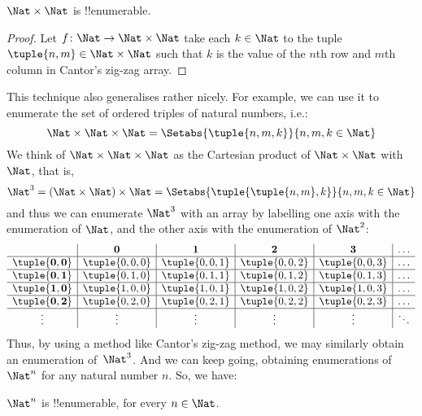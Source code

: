 \documentclass[../../../include/open-logic-section]{subfiles}
\begin{document}
\begin{prop}
$\Nat \times \Nat$ is !!{enumerable}.
\end{prop}

\begin{proof}
Let $f \colon \Nat \to \Nat\times\Nat$ take each $k \in \Nat$ to the
tuple $\tuple{n,m} \in \Nat \times \Nat$ such that $k$ is the value of
the $n$th row and $m$th column in Cantor's zig-zag array. 
\end{proof}

\begin{explain}
This technique also generalises rather nicely. For example, we can use
it to enumerate the set of ordered triples of natural numbers, i.e.:
\[
\Nat \times \Nat \times \Nat = \Setabs{\tuple{n,m,k}}{n,m,k \in \Nat}
\]
We think of $\Nat \times \Nat \times \Nat$ as the Cartesian
product of $\Nat \times \Nat$ with $\Nat$, that is,
\[
\Nat^3 = (\Nat \times \Nat) \times \Nat =
\Setabs{\tuple{\tuple{n,m},k}}{n, m, k
  \in \Nat }
\]
and thus we can enumerate $\Nat^3$ with an array by labelling one
axis with the enumeration of $\Nat$, and the other axis with the
enumeration of $\Nat^2$:
\[
\begin{array}{ c | c | c | c | c | c}
& \mathbf 0 & \mathbf 1 & \mathbf 2 & \mathbf 3 & \dots \\
\hline
\mathbf{\tuple{0,0}} & \tuple{0,0,0} & \tuple{0,0,1} & \tuple{0,0,2} & \tuple{0,0,3} & \dots \\
\hline
\mathbf{\tuple{0,1}} & \tuple{0,1,0} & \tuple{0,1,1} & \tuple{0,1,2} & \tuple{0,1,3} & \dots \\
\hline
\mathbf{\tuple{1,0}} & \tuple{1,0,0} & \tuple{1,0,1} & \tuple{1,0,2} & \tuple{1,0,3} & \dots \\
\hline
\mathbf{\tuple{0,2}} & \tuple{0,2,0} & \tuple{0,2,1} & \tuple{0,2,2} & \tuple{0,2,3} & \dots\\
\hline
\vdots & \vdots & \vdots & \vdots & \vdots & \ddots \\
\end{array}
\]
Thus, by using a method like Cantor's zig-zag method, we may similarly
obtain an enumeration of~$\Nat^3$. And we can keep going, obtaining
enumerations of $\Nat^n$ for any natural number $n$. So, we have:
\end{explain}

\begin{prop}
$\Nat^n$ is !!{enumerable}, for every $n \in \Nat$.
\end{prop}
\end{document}
